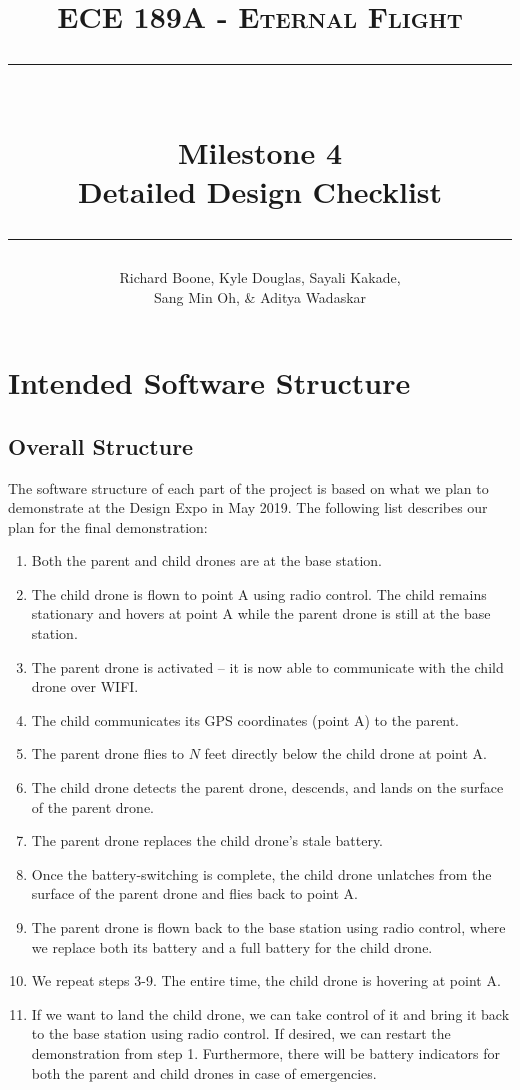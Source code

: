 \documentclass[paper=a4, fontsize=10pt]{scrartcl}
\title{
		\vspace{-1in} 	
		\usefont{OT1}{bch}{b}{n}
		\normalfont \large \textsc{ECE 189A - Eternal Flight} \\ [10pt]
		\rule{\linewidth}{2pt} \\ [0.4cm]
		\Huge Milestone 4 \\
		\LARGE Detailed Design Checklist \\
		\rule{\linewidth}{2pt}
}
\author{
		\normalfont 
		\large Richard Boone, Kyle Douglas, Sayali Kakade, \\
		\large Sang Min Oh, \& Aditya Wadaskar \\ [-3pt]		 			%
}
\date{}
\begin{document}
\maketitle

\vspace{-0.5in}%
\section{Intended Software Structure}
\subsection*{Overall Structure}
The software structure of each part of the project is based on what we plan to demonstrate at the Design Expo in May 2019. The following list describes our plan for the final demonstration:
\begin{enumerate}
	\item Both the parent and child drones are at the base station.
	\item The child drone is flown to point A using radio control. The child remains stationary and hovers at point A while the parent drone is still at the base station.
	\item The parent drone is activated -- it is now able to communicate with the child drone over WIFI.
	\item The child communicates its GPS coordinates (point A) to the parent.
	\item The parent drone flies to $N$ feet directly below the child drone at point A.
	\item The child drone detects the parent drone, descends, and lands on the surface of the parent drone. 
	\item The parent drone replaces the child drone's stale battery.
	\item Once the battery-switching is complete, the child drone unlatches from the surface of the parent drone and flies back to point A.
	\item The parent drone is flown back to the base station using radio control, where we replace both its battery and a full battery for the child drone.
	\item We repeat steps 3-9. The entire time, the child drone is hovering at point A.
	\item If we want to land the child drone, we can take control of it and bring it back to the base station using radio control. If desired, we can restart the demonstration from step 1. Furthermore, there will be battery indicators for both the parent and child drones in case of emergencies.
\end{enumerate}
\end{document}
